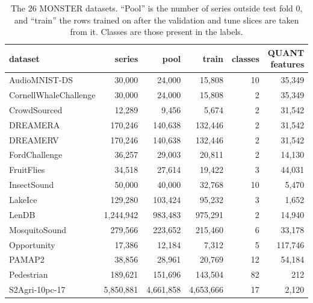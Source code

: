 \documentclass[a4paper, 11pt]{article}
\begin{document}
\begin{table}[h]
    \centering
    \small
    \caption{The 26 MONSTER datasets. ``Pool'' is the number of series outside
        test fold 0, and ``train'' the rows trained on after the validation
        and tune slices are taken from it. Classes are those present in the
        labels.}
    \label{tab:monster-data}
    \begin{tabular}{lrrrrr}
        \toprule
        dataset               & series    & pool      & train     & classes & QUANT features \\
        \midrule
        AudioMNIST-DS         & 30,000    & 24,000    & 15,808    & 10      & 35,349         \\
        CornellWhaleChallenge & 30,000    & 24,000    & 15,808    & 2       & 35,349         \\
        CrowdSourced          & 12,289    & 9,456     & 5,674     & 2       & 31,542         \\
        DREAMERA              & 170,246   & 140,638   & 132,446   & 2       & 31,542         \\
        DREAMERV              & 170,246   & 140,638   & 132,446   & 2       & 31,542         \\
        FordChallenge         & 36,257    & 29,003    & 20,811    & 2       & 14,130         \\
        FruitFlies            & 34,518    & 27,614    & 19,422    & 3       & 44,031         \\
        InsectSound           & 50,000    & 40,000    & 32,768    & 10      & 5,470          \\
        LakeIce               & 129,280   & 103,424   & 95,232    & 3       & 1,652          \\
        LenDB                 & 1,244,942 & 983,483   & 975,291   & 2       & 14,940         \\
        MosquitoSound         & 279,566   & 223,652   & 215,460   & 6       & 33,178         \\
        Opportunity           & 17,386    & 12,184    & 7,312     & 5       & 117,746        \\
        PAMAP2                & 38,856    & 28,961    & 20,769    & 12      & 54,184         \\
        Pedestrian            & 189,621   & 151,696   & 143,504   & 82      & 212            \\
        S2Agri-10pc-17        & 5,850,881 & 4,661,858 & 4,653,666 & 17      & 2,120          \\

\end{tabular}
\end{table}
\end{document}

